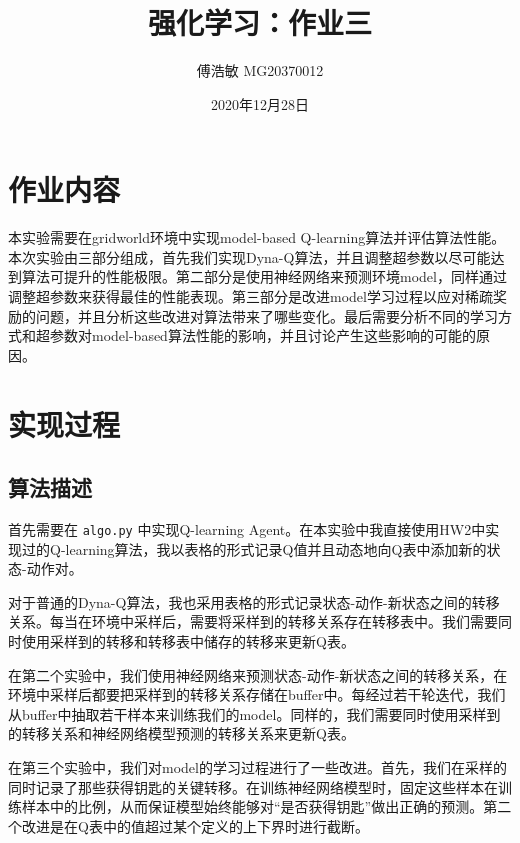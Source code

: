 \documentclass[a4paper,12pt]{article}
\begin{document}
\begin{CJK}{UTF8}{gbsn}

\title{强化学习：作业三}

\author{傅浩敏 MG20370012}

\date{2020年12月28日}

\maketitle

\section{作业内容}
本实验需要在gridworld环境中实现model-based Q-learning算法并评估算法性能。本次实验由三部分组成，首先我们实现Dyna-Q算法，并且调整超参数以尽可能达到算法可提升的性能极限。第二部分是使用神经网络来预测环境model，同样通过调整超参数来获得最佳的性能表现。第三部分是改进model学习过程以应对稀疏奖励的问题，并且分析这些改进对算法带来了哪些变化。最后需要分析不同的学习方式和超参数对model-based算法性能的影响，并且讨论产生这些影响的可能的原因。

\section{实现过程}
\subsection{算法描述}
首先需要在 \texttt{algo.py} 中实现Q-learning Agent。在本实验中我直接使用HW2中实现过的Q-learning算法，我以表格的形式记录Q值并且动态地向Q表中添加新的状态-动作对。

对于普通的Dyna-Q算法，我也采用表格的形式记录状态-动作-新状态之间的转移关系。每当在环境中采样后，需要将采样到的转移关系存在转移表中。我们需要同时使用采样到的转移和转移表中储存的转移来更新Q表。

在第二个实验中，我们使用神经网络来预测状态-动作-新状态之间的转移关系，在环境中采样后都要把采样到的转移关系存储在buffer中。每经过若干轮迭代，我们从buffer中抽取若干样本来训练我们的model。同样的，我们需要同时使用采样到的转移关系和神经网络模型预测的转移关系来更新Q表。

在第三个实验中，我们对model的学习过程进行了一些改进。首先，我们在采样的同时记录了那些获得钥匙的关键转移。在训练神经网络模型时，固定这些样本在训练样本中的比例，从而保证模型始终能够对“是否获得钥匙”做出正确的预测。第二个改进是在Q表中的值超过某个定义的上下界时进行截断。

\end{CJK}
\end{document}
